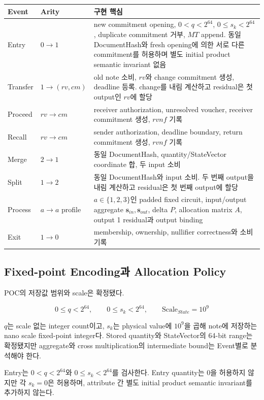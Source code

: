 \documentclass[11pt,a4paper]{extarticle}
\begin{document}
\begin{longtable}{@{}p{}p{}p{}@{}}
\toprule
Event & Arity & 구현 핵심 \\
\midrule
\endhead
Entry & $0\to1$ & new commitment opening, $0<q<2^{64}$, $0\leq s_k<2^{64}$, duplicate commitment 거부, $MT$ append. 동일 DocumentHash와 fresh opening에 의한 서로 다른 commitment를 허용하며 별도 initial product semantic invariant 없음 \\
Transfer & $1\to(rv,cm)$ & old note 소비, $rv$와 change commitment 생성, deadline 등록. change를 내림 계산하고 residual은 첫 output인 $rv$에 할당 \\
Proceed & $rv\to cm$ & receiver authorization, unresolved voucher, receiver commitment 생성, $rvnf$ 기록 \\
Recall & $rv\to cm$ & sender authorization, deadline boundary, return commitment 생성, $rvnf$ 기록 \\
Merge & $2\to1$ & 동일 DocumentHash, quantity/StateVector coordinate 합, 두 input 소비 \\
Split & $1\to2$ & 동일 DocumentHash와 input 소비. 두 번째 output을 내림 계산하고 residual은 첫 번째 output에 할당 \\
Process & $a\to a$ profile & $a\in\{1,2,3\}$인 padded fixed circuit, input/output aggregate
$\mathbf{s}_{in},\mathbf{s}_{out}$, delta $P$, allocation matrix $A$, output 1 residual과
output binding \\
Exit & $1\to0$ & membership, ownership, nullifier correctness와 소비 기록 \\
\bottomrule
\end{longtable}

\subsection{Fixed-point Encoding과 Allocation Policy}

POC의 저장값 범위와 scale은 확정됐다.

\[
0\leq q<2^{64},
\qquad
0\leq s_k<2^{64},
\qquad
\mathrm{Scale}_{State}=10^9
\]

$q$는 scale 없는 integer count이고, $s_k$는 physical value에 $10^9$을 곱해
note에 저장하는 nano scale fixed-point integer다. Stored quantity와 StateVector의
64-bit range는 확정됐지만 aggregate와 cross multiplication의 intermediate bound는
Event별로 분석해야 한다.

Entry는 $0<q<2^{64}$와 $0\leq s_k<2^{64}$를 검사한다. Entry quantity는
0을 허용하지 않지만 각 $s_k=0$은 허용하며, attribute 간 별도 initial product
semantic invariant를 추가하지 않는다.
\end{document}

